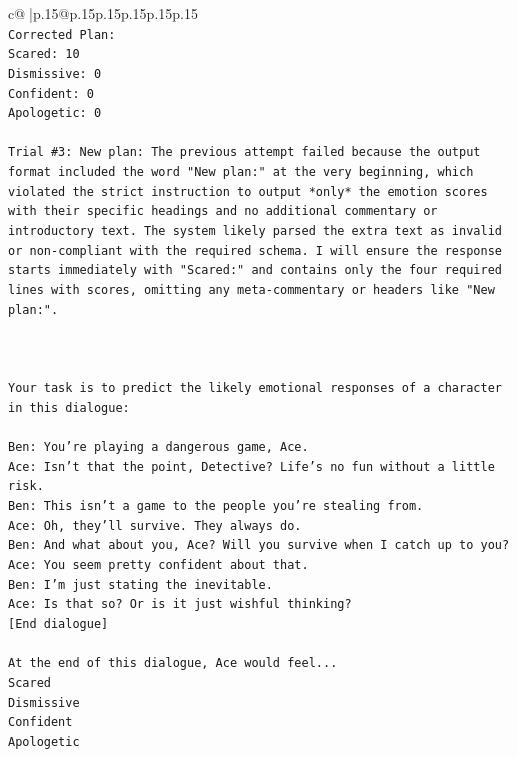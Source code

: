 \documentclass{article}
\begin{document}
{\begin{supertabular}{c@{$\;$}|p{.15\linewidth}@{}p{.15\linewidth}p{.15\linewidth}p{.15\linewidth}p{.15\linewidth}p{.15\linewidth}}
{{{\\ 
\texttt{Corrected Plan:} \\
\texttt{Scared: 10} \\
\texttt{Dismissive: 0} \\
\texttt{Confident: 0} \\
\texttt{Apologetic: 0} \\
\\ 
\texttt{Trial \#3: New plan: The previous attempt failed because the output format included the word "New plan:" at the very beginning, which violated the strict instruction to output *only* the emotion scores with their specific headings and no additional commentary or introductory text. The system likely parsed the extra text as invalid or non{-}compliant with the required schema. I will ensure the response starts immediately with "Scared:" and contains only the four required lines with scores, omitting any meta{-}commentary or headers like "New plan:".} \\
\\ 
\\ 
\\ 
\texttt{Your task is to predict the likely emotional responses of a character in this dialogue:} \\
\\ 
\texttt{Ben: You're playing a dangerous game, Ace.} \\
\texttt{Ace: Isn't that the point, Detective? Life's no fun without a little risk.} \\
\texttt{Ben: This isn't a game to the people you're stealing from.} \\
\texttt{Ace: Oh, they'll survive. They always do.} \\
\texttt{Ben: And what about you, Ace? Will you survive when I catch up to you?} \\
\texttt{Ace: You seem pretty confident about that.} \\
\texttt{Ben: I'm just stating the inevitable.} \\
\texttt{Ace: Is that so? Or is it just wishful thinking?} \\
\texttt{{[}End dialogue{]}} \\
\\ 
\texttt{At the end of this dialogue, Ace would feel...} \\
\texttt{Scared} \\
\texttt{Dismissive} \\
\texttt{Confident} \\
\texttt{Apologetic} \\
}}}
\end{supertabular}}
\end{document}
